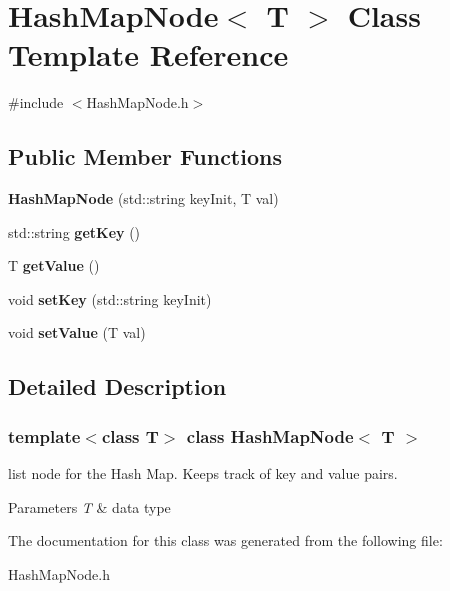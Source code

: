 \hypertarget{class_hash_map_node}{}\section{Hash\+Map\+Node$<$ T $>$ Class Template Reference}
\label{class_hash_map_node}


{\ttfamily \#include $<$Hash\+Map\+Node.\+h$>$}

\subsection*{Public Member Functions}
\begin{DoxyCompactItemize}
\item 
\mbox{\label{class_hash_map_node_a4cfb7cf18b2ca41357310326b577504c}} 
{\bfseries Hash\+Map\+Node} (std\+::string key\+Init, T val)
\item 
\mbox{\label{class_hash_map_node_ad6463320fe646898360fb61f1bfc04ac}} 
std\+::string {\bfseries get\+Key} ()
\item 
\mbox{\label{class_hash_map_node_a8855969959e0e16cc0b2f65a959c6d70}} 
T {\bfseries get\+Value} ()
\item 
\mbox{\label{class_hash_map_node_acd114aca39f06e753419885d13688dd7}} 
void {\bfseries set\+Key} (std\+::string key\+Init)
\item 
\mbox{\label{class_hash_map_node_a93bad2ab96c6184d71779626f318ac9b}} 
void {\bfseries set\+Value} (T val)
\end{DoxyCompactItemize}


\subsection{Detailed Description}
\subsubsection*{template$<$class T$>$\newline
class Hash\+Map\+Node$<$ T $>$}

list node for the Hash Map. Keeps track of key and value pairs. 
\begin{DoxyParams}{Parameters}
{\em T} & data type \\
\hline
\end{DoxyParams}


The documentation for this class was generated from the following file\+:\begin{DoxyCompactItemize}
\item 
Hash\+Map\+Node.\+h\end{DoxyCompactItemize}
